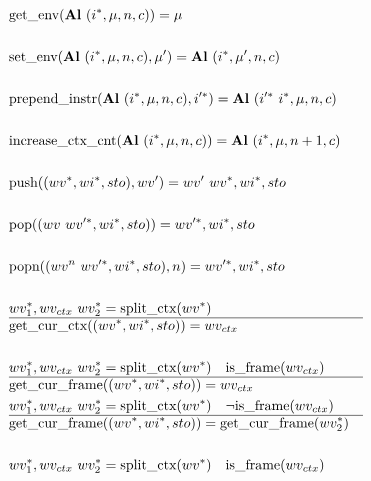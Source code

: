 \begin{align*}
%
\newline \\
  &\getenv(\al ~ (\seq i, \mu, n, c)) = \mu \\
%
\newline \\
  &\setenv(\al ~ (\seq i, \mu, n, c), \mu') = \al ~ (\seq i, \mu', n, c) \\
%
\newline \\
  &\prependinstr(\al ~ (\seq i, \mu, n, c), \seq{i'}) = \al ~ (\seq{i'} ~ \seq i, \mu, n, c) \\
%
\newline \\
  &\increasectxcnt(\al ~ (\seq i, \mu, n, c)) = \al ~ (\seq i, \mu, n + 1, c) \\
%
\newline \\
  &\push((\seq{wv}, \seq{wi}, sto), wv') = wv' ~ \seq{wv}, \seq{wi}, sto \\
%
\newline \\
  &\pop((wv ~ \seq{wv'}, \seq{wi}, sto)) = \seq{wv'}, \seq{wi}, sto \\
%
\newline \\
  &\popn((wv^n ~ \seq{wv'}, \seq{wi}, sto), n) = \seq{wv'}, \seq{wi}, sto \\
%
\newline \\
  &\seq{wv_1}, wv_{ctx} ~ \seq{wv_2} = \splitctx(\seq{wv}) \\
  \hline
  &\getcurctx((\seq{wv}, \seq{wi}, sto)) = wv_{ctx} \\
%
\newline \\
  &\seq{wv_1}, wv_{ctx} ~ \seq{wv_2} = \splitctx(\seq{wv}) \quad \isframe(wv_{ctx}) \\
  \hline
  &\getcurframe((\seq{wv}, \seq{wi}, sto)) = wv_{ctx} \\
  &\seq{wv_1}, wv_{ctx} ~ \seq{wv_2} = \splitctx(\seq{wv}) \quad \neg \isframe(wv_{ctx}) \\
  \hline
  &\getcurframe((\seq{wv}, \seq{wi}, sto)) = \getcurframe(\seq{wv_2}) \\
%
\newline \\
  &\seq{wv_1}, wv_{ctx} ~ \seq{wv_2} = \splitctx(\seq{wv}) \quad \isframe(wv_{ctx}) \\

\end{align*}
